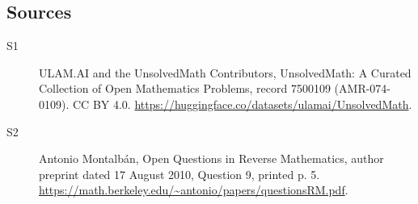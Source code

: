 \documentclass[11pt]{article}
\begin{document}
\subsection{Sources}
\begin{description}
\item[\hypertarget{source:7500109:1}{S1}] ULAM.AI and the UnsolvedMath Contributors, UnsolvedMath: A Curated Collection of Open Mathematics Problems, record 7500109 (AMR-074-0109). CC BY 4.0. \url{https://huggingface.co/datasets/ulamai/UnsolvedMath}.
\item[\hypertarget{source:7500109:2}{S2}] Antonio Montalbán, Open Questions in Reverse Mathematics, author preprint dated 17 August 2010, Question 9, printed p. 5. \url{https://math.berkeley.edu/~antonio/papers/questionsRM.pdf}.
\end{description}
\label{end:7500109}
\end{document}
